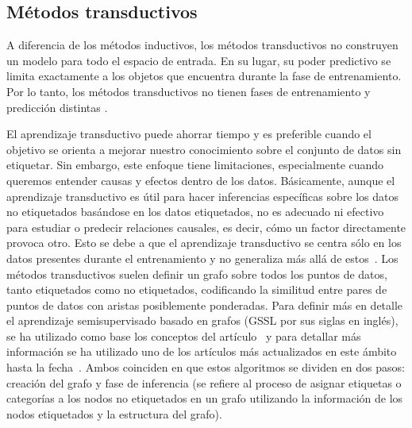 \subsection{Métodos transductivos} \label{sec3:transductivo}
A diferencia de los métodos inductivos, los métodos transductivos no construyen un modelo para todo el espacio de entrada. En su lugar, su poder predictivo se limita exactamente a los objetos que encuentra durante la fase de entrenamiento. Por lo tanto, los métodos transductivos no tienen fases de entrenamiento y predicción distintas \cite{Engelen:semi-supervised}.

El aprendizaje transductivo puede ahorrar tiempo y es preferible cuando el objetivo se orienta a mejorar nuestro conocimiento sobre el conjunto de datos sin etiquetar. Sin embargo, este enfoque tiene limitaciones, especialmente cuando queremos entender causas y efectos dentro de los datos. Básicamente, aunque el aprendizaje transductivo es útil para hacer inferencias específicas sobre los datos no etiquetados basándose en los datos etiquetados, no es adecuado ni efectivo para estudiar o predecir relaciones causales, es decir, cómo un factor directamente provoca otro. Esto se debe a que el aprendizaje transductivo se centra sólo en los datos presentes durante el entrenamiento y no generaliza más allá de estos~\cite{web:assumptions}.
Los métodos transductivos suelen definir un grafo sobre todos los puntos de datos, tanto etiquetados como no etiquetados, codificando la similitud entre pares de puntos de datos con aristas posiblemente ponderadas. Para definir más en detalle el aprendizaje semisupervisado basado en grafos (GSSL por sus siglas en inglés), se ha utilizado como base los conceptos del artículo~\cite{Engelen:semi-supervised} y para detallar más información se ha utilizado uno de los artículos más actualizados en este ámbito hasta la fecha~\cite{GSSL:review}. Ambos coinciden en que estos algoritmos se dividen en dos pasos: creación del grafo y fase de inferencia (se refiere al proceso de asignar etiquetas o categorías a los nodos no etiquetados en un grafo utilizando la información de los nodos etiquetados y la estructura del grafo).
